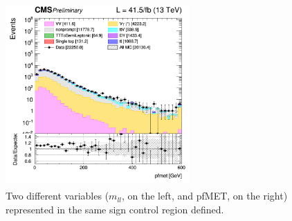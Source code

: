 \documentclass[a4paper, 10pt, openright]{report}
\begin{document}
\begin{figure}[htbp]
{\begin{minipage}[b]{.48\textwidth}
\end{minipage}\hfill
\begin{minipage}[b]{.48\textwidth}
\includegraphics[width=7cm, height=7cm]{figs/2017/log_cratio_SSCR_ll_METcorrected_pt.png}
\end{minipage} \hfill
}
\caption{Two different variables ($m_{ll}$, on the left, and pf\ac{MET}, on the right) represented in the same sign control region defined.}
\label{fig:SSCR}
\end{figure}
\end{document}
